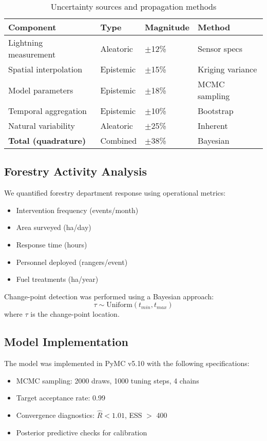 \documentclass[11pt,a4paper]{article}
\begin{document}
\begin{table}[H]
\centering
\caption{Uncertainty sources and propagation methods}
\label{tab:uncertainty}
\begin{tabular}{llll}
\toprule
\textbf{Component} & \textbf{Type} & \textbf{Magnitude} & \textbf{Method} \\
\midrule
Lightning measurement & Aleatoric & $\pm$12\% & Sensor specs \\
Spatial interpolation & Epistemic & $\pm$15\% & Kriging variance \\
Model parameters & Epistemic & $\pm$18\% & MCMC sampling \\
Temporal aggregation & Epistemic & $\pm$10\% & Bootstrap \\
Natural variability & Aleatoric & $\pm$25\% & Inherent \\
\midrule
\textbf{Total (quadrature)} & Combined & $\pm$38\% & Bayesian \\
\bottomrule
\end{tabular}
\end{table}

\subsection{Forestry Activity Analysis}

We quantified forestry department response using operational metrics:
\begin{itemize}
    \item Intervention frequency (events/month)
    \item Area surveyed (ha/day)
    \item Response time (hours)
    \item Personnel deployed (rangers/event)
    \item Fuel treatments (ha/year)
\end{itemize}

Change-point detection was performed using a Bayesian approach:
\begin{equation}
\tau \sim \text{Uniform}(t_{min}, t_{max})
\end{equation}
where $\tau$ is the change-point location.

\subsection{Model Implementation}

The model was implemented in PyMC v5.10 with the following specifications:
\begin{itemize}
    \item MCMC sampling: 2000 draws, 1000 tuning steps, 4 chains
    \item Target acceptance rate: 0.99
    \item Convergence diagnostics: $\hat{R} < 1.01$, ESS $>$ 400
    \item Posterior predictive checks for calibration
\end{itemize}
\end{document}
